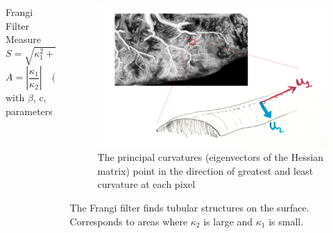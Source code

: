 \documentclass[9pt,notes]{beamer}
\newcommand{\Blue}[1]{{\color{Blue}{#1}}}
\begin{document}
\begin{frame}
\begin{columns}[c]
\begin{column}{0.4\textwidth}
\begin{block}{\footnotesize Frangi Filter Measure}
	\begin{equation}
	S = \sqrt{\kappa_1^2 + \kappa_2^2} \quad\text{(structureness)}
	\end{equation}	
	\begin{equation}
	A = \left|\frac{{\kappa_1}}{\kappa_2}\right| \quad\text{(anisotropy)}
	\end{equation}
	\qquad \qquad with $\beta$, c, parameters
	\end{block}
\end{column}
\begin{column}{0.55\textwidth}
\begin{figure}[h]
\includegraphics[width=\textwidth]{svginset}
\caption{\footnotesize{The principal curvatures (eigenvectors of the Hessian matrix) point in the direction of greatest and least curvature at each pixel}}
\end{figure}

The Frangi filter \Blue{[2]} finds tubular structures on the surface. Corresponds to areas where $\kappa_2$ is large and $\kappa_1$ is small.

\end{column}
\end{columns}
\end{frame}
\end{document}
